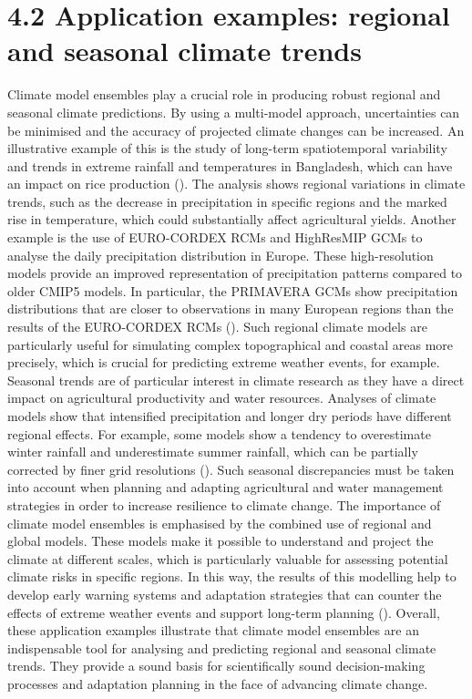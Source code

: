 \documentclass[
]{krantz}
\begin{document}
\section{4.2 Application examples: regional and seasonal climate trends}\label{application-examples-regional-and-seasonal-climate-trends}

Climate model ensembles play a crucial role in producing robust regional and seasonal climate predictions. By using a multi-model approach, uncertainties can be minimised and the accuracy of projected climate changes can be increased. An illustrative example of this is the study of long-term spatiotemporal variability and trends in extreme rainfall and temperatures in Bangladesh, which can have an impact on rice production (\citet{mainuddin2022long}). The analysis shows regional variations in climate trends, such as the decrease in precipitation in specific regions and the marked rise in temperature, which could substantially affect agricultural yields.
Another example is the use of EURO-CORDEX RCMs and HighResMIP GCMs to analyse the daily precipitation distribution in Europe. These high-resolution models provide an improved representation of precipitation patterns compared to older CMIP5 models. In particular, the PRIMAVERA GCMs show precipitation distributions that are closer to observations in many European regions than the results of the EURO-CORDEX RCMs (\citet{demory2020european}). Such regional climate models are particularly useful for simulating complex topographical and coastal areas more precisely, which is crucial for predicting extreme weather events, for example.
Seasonal trends are of particular interest in climate research as they have a direct impact on agricultural productivity and water resources. Analyses of climate models show that intensified precipitation and longer dry periods have different regional effects. For example, some models show a tendency to overestimate winter rainfall and underestimate summer rainfall, which can be partially corrected by finer grid resolutions (\citet{demory2020european}). Such seasonal discrepancies must be taken into account when planning and adapting agricultural and water management strategies in order to increase resilience to climate change.
The importance of climate model ensembles is emphasised by the combined use of regional and global models. These models make it possible to understand and project the climate at different scales, which is particularly valuable for assessing potential climate risks in specific regions. In this way, the results of this modelling help to develop early warning systems and adaptation strategies that can counter the effects of extreme weather events and support long-term planning (\citet{falloon2014ensembles}). Overall, these application examples illustrate that climate model ensembles are an indispensable tool for analysing and predicting regional and seasonal climate trends. They provide a sound basis for scientifically sound decision-making processes and adaptation planning in the face of advancing climate change.
\end{document}
